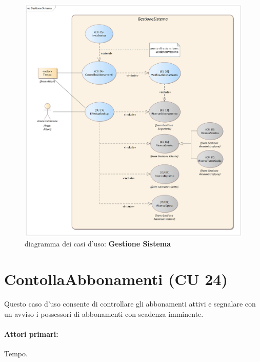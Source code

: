 \documentclass{article}
\begin{document}
\begin{figure}[h]
    \centering
    \includegraphics[width=1\textwidth]{Gestione Sistema}
    \caption{diagramma dei casi d'uso: \textbf{Gestione Sistema}}
    \label{fig:GestioneSistema}
\end{figure}

\newpage
	
	
	
	
	
	
	
	
	
	
	
	
	
	
	
\section*{ContollaAbbonamenti (CU 24)}
    
  \indent\indent   Questo caso d'uso consente di controllare gli abbonamenti attivi e segnalare con un avviso i possessori di abbonamenti con scadenza imminente.
    
    \paragraph{Attori primari:}Tempo.
	
\end{document}

